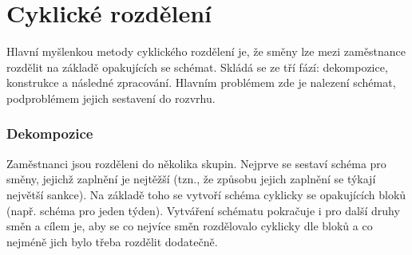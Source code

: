 \documentclass[twoside]{ctuthesis}
\begin{document}


%
%
% 
%
% 

\section{Cyklické rozdělení}
Hlavní myšlenkou metody cyklického rozdělení je, že směny lze mezi zaměstnance rozdělit na základě opakujících se schémat. Skládá se ze tří fází: dekompozice, konstrukce a následné zpracování. \cite{brucker2005decomposition} Hlavním problémem zde je nalezení schémat, podproblémem jejich sestavení do rozvrhu. \cite{becker2020decomposition}

\subsubsection{Dekompozice}
Zaměstnanci jsou rozděleni do několika skupin. Nejprve se sestaví schéma pro směny, jejichž zaplnění je nejtěžší (tzn., že způsobu jejich zaplnění se týkají největší sankce). Na základě toho se vytvoří schéma cyklicky se opakujících bloků (např. schéma pro jeden týden). Vytváření schématu pokračuje i pro další druhy směn a cílem je, aby se co nejvíce směn rozdělovalo cyklicky dle bloků a co nejméně jich bylo třeba rozdělit dodatečně.
\end{document}
